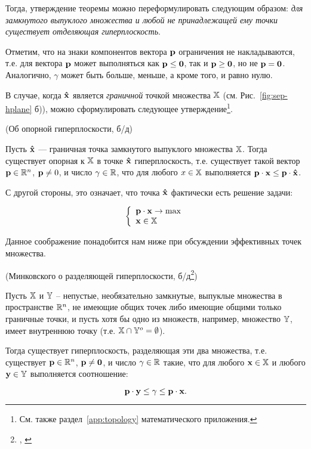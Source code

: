 Тогда, утверждение теоремы можно переформулировать следующим
образом: \emph{для замкнутого выпуклого множества и любой не
принадлежащей ему точки существует отделяющая гиперплоскость}.

\begin{note}

Отметим, что на знаки компонентов вектора $\mathbf{p}$ ограничения не
накладываются, т.е. для вектора $\mathbf{p}$ может выполняться как
$\mathbf{p} \leq \mathbf{0}$, так и $\mathbf{p} \geq \mathbf{0}$, но не $\mathbf{p} =
\mathbf{0}$. Аналогично, $\gamma$ может быть больше, меньше, а кроме
того, и равно нулю.
\end{note}




В случае, когда $\mathbf{\hat x}$ является \emph{граничной} точкой
множества $\mathbb{X}$ (см. Рис.~\ref{fig:sep-hplane} б)), можно
сформулировать следующее утверждение\footnote{См. также
раздел~\vref{app:topology} математического приложения.}.

\begin{teo}(Об опорной гиперплоскости, б/д)

Пусть $\mathbf{\hat x}$  --- граничная точка замкнутого выпуклого
множества $\mathbb{X}$. Тогда существует опорная к $\mathbb{X}$ в точке
$\mathbf{\hat x}$ гиперплоскость, т.е. существует такой вектор $\mathbf{p}
\in \mathbb{R}^n$, $\mathbf{p} \neq 0$, и число $\gamma \in \mathbb{R}$, что для любого
$x \in \mathbb{X}$ выполняется $\mathbf{p} \cdot \mathbf{x} \leq \mathbf{p} \cdot
\mathbf{\hat x}$.
\end{teo}

\begin{note}
С другой стороны, это означает, что точка $\mathbf{\hat x}$ фактически
есть решение задачи:

\[
\left\{ \begin{array}{l}
 \mathbf{p} \cdot \mathbf{x} \rightarrow \max\\
 \mathbf{x} \in \mathbb{X} \\
 \end{array} \right.
\]

Данное соображение понадобится нам ниже при обсуждении эффективных
точек множества.
\end{note}



\begin{teo}\label{teo:sep_hplane_Mink}(Минковского о
разделяющей гиперплоскости, б/д\/\footnote{\cite{Takayama:1985},
\cite{Braverman:1976}})

Пусть $\mathbb{X}$ и $\mathbb{Y}$ -- непустые, необязательно замкнутые,
выпуклые множества в пространстве $\mathbb{R}^n$, не имеющие общих точек
либо имеющие общими только граничные точки, и пусть хотя бы одно из
множеств, например, множество $\mathbb{Y}$, имеет внутреннюю точку (т.е.
$\mathbb{X} \cap \mathbb{Y}^o = \emptyset$).

Тогда существует гиперплоскость, разделяющая эти два множества, т.е.
существует $\mathbf{p} \in \mathbb{R}^n$, $\mathbf{p} \neq \mathbf{0}$, и число $\gamma
\in \mathbb{R}$ такие, что для любого $\mathbf{x} \in \mathbb{X}$ и любого $\mathbf{y}
\in \mathbb{Y}$ выполняется соотношение:

\[
\mathbf{p} \cdot \mathbf{y} \leq \gamma \leq \mathbf{p} \cdot \mathbf{x}.
\]
\end{teo}

